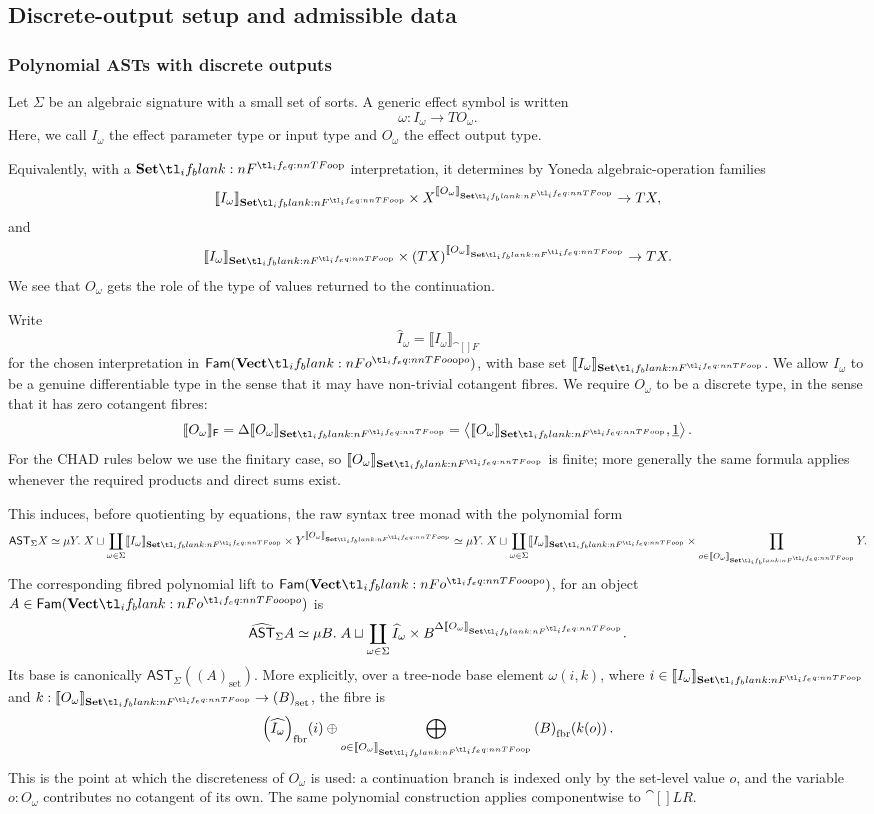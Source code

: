 \documentclass[11pt,a4paper]{article}
\theoremstyle{definition}
\theoremstyle{remark}
\providecommand{\AST}{\mathsf{AST}}
\providecommand{\Fam}[1]{\mathsf{Fam}(#1)}
\providecommand{\base}[1]{\left(#1\right)_{\mathrm{set}}}
\providecommand{\fibr}[1]{\left(#1\right)_{\mathrm{fbr}}}
\providecommand{\setint}[1]{\llbracket #1\rrbracket_{\Set}}
\providecommand{\fvoint}[1]{\llbracket #1\rrbracket_{\cat[]{F}}}
\begin{document}
\subsection{Discrete-output setup and admissible data}
\label{sec:appendix-general-effect-recipe}

\subsubsection{Polynomial ASTs with discrete outputs}

Let \( \Sigma \) be an algebraic signature with a small set of sorts. 
A generic effect symbol is written
\[
  \omega:I_{\omega}\to T O_{\omega}.
\]
Here, we call \(I_{\omega}\) the effect parameter type or input type and \(O_{\omega}\) the effect output type.

Equivalently, with a \( \Set \) interpretation, it determines by Yoneda algebraic-operation families
\[
  \setint{I_{\omega}}\times X^{\setint{O_{\omega}}}
  \to TX,
\]
and 
\[
  \setint{I_{\omega}}\times (TX)^{\setint{O_{\omega}}}
  \to TX .
\]
We see that \( O_{\omega} \) gets the role of the type of values returned to the continuation.


Write
\[
  \widehat I_{\omega}=\fvoint{I_{\omega}}
\]
for the chosen interpretation in \( \Fam{\Vect[o]} \), with base set \(\setint{I_{\omega}}\).
We allow \( I_{\omega} \) to be a genuine differentiable type in the sense that it may have non-trivial cotangent fibres. 
We require \( O_{\omega} \) to be a discrete type, in the sense that it has zero cotangent fibres:
\[
  \fvoint{O_{\omega}}=\Delta\setint{O_{\omega}}=\tuple{\setint{O_{\omega}},\underline{1}}.
\]
For the CHAD rules below we use the finitary case, so \(\setint{O_{\omega}}\) is finite; more generally the same formula applies whenever the required products and direct sums exist.

This induces, before quotienting by equations, the raw syntax tree monad with the polynomial form
\[
  \AST_{\Sigma}X
  \simeq
  \mu Y.\;
  X\sqcup
  \coprod_{\omega\in\Sigma}
  \setint{I_{\omega}}\times
  Y^{\setint{O_{\omega}}}
  \simeq
  \mu Y.\;
  X\sqcup
  \coprod_{\omega\in\Sigma}
  \setint{I_{\omega}}\times
  \prod_{o\in\setint{O_{\omega}}}Y .
\]
The corresponding fibred polynomial lift to \(\Fam{\Vect[o]}\), for an object \(A\in\Fam{\Vect[o]}\) is
\[
  \widehat{\AST}_{\Sigma}A
  \simeq
  \mu B.\;
  A\sqcup
  \coprod_{\omega\in\Sigma}
  \widehat I_{\omega}\times
  B^{\Delta\setint{O_{\omega}}} .
\]
Its base is canonically \(\AST_{\Sigma}(\base{A})\). More explicitly, over a tree-node base element \(\omega(i,k)\), where \(i\in\setint{I_{\omega}}\) and \(k:\setint{O_{\omega}}\to\base{B}\), the fibre is
\[
  \Fun[np]{\fibr{ \widehat{I_{\omega}} }}{i}
  \oplus
  \bigoplus_{o\in\setint{O_{\omega}}}
  \Fun[np]{\fibr{B}}{k(o)} .
\]
This is the point at which the discreteness of \(O_{\omega}\) is used: a continuation branch is indexed only by the set-level value \(o\), and the variable \(o:O_{\omega}\) contributes no cotangent of its own. The same polynomial construction applies componentwise to \(\cat[]{LR}\).
\end{document}
